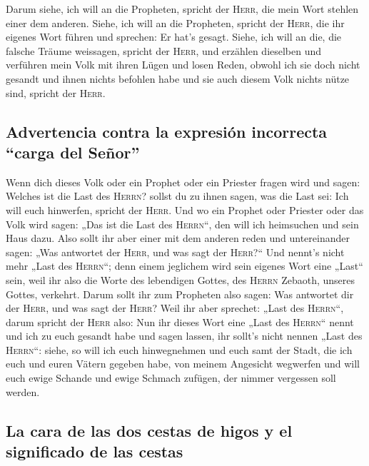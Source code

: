  Darum siehe, ich will an die Propheten, spricht der
\textsc{Herr}, die mein Wort stehlen einer dem anderen. 
Siehe, ich will an die Propheten, spricht der \textsc{Herr}, die ihr
eigenes Wort führen und sprechen: Er hat's gesagt. 
Siehe, ich will an die, die falsche Träume weissagen, spricht der
\textsc{Herr}, und erzählen dieselben und verführen mein Volk mit ihren
Lügen und losen Reden, obwohl ich sie doch nicht gesandt und ihnen
nichts befohlen habe und sie auch diesem Volk nichts nütze sind, spricht
der \textsc{Herr}.

\hypertarget{advertencia-contra-la-expresiuxf3n-incorrecta-carga-del-seuxf1or}{%
\subsection{Advertencia contra la expresión incorrecta ``carga del
Señor''}\label{advertencia-contra-la-expresiuxf3n-incorrecta-carga-del-seuxf1or}}

 Wenn dich dieses Volk oder ein Prophet oder ein Priester
fragen wird und sagen: Welches ist die Last des \textsc{Herrn}? sollst
du zu ihnen sagen, was die Last sei: Ich will euch hinwerfen, spricht
der \textsc{Herr}.  Und wo ein Prophet oder Priester oder
das Volk wird sagen: „Das ist die Last des \textsc{Herrn}``, den will
ich heimsuchen und sein Haus dazu.  Also sollt ihr aber
einer mit dem anderen reden und untereinander sagen: „Was antwortet der
\textsc{Herr}, und was sagt der \textsc{Herr}?{}``  Und
nennt's nicht mehr „Last des \textsc{Herrn}``; denn einem jeglichem wird
sein eigenes Wort eine „Last`` sein, weil ihr also die Worte des
lebendigen Gottes, des \textsc{Herrn} Zebaoth, unseres Gottes, verkehrt.
 Darum sollt ihr zum Propheten also sagen: Was antwortet
dir der \textsc{Herr}, und was sagt der \textsc{Herr}? 
Weil ihr aber sprechet: „Last des \textsc{Herrn}``, darum spricht der
\textsc{Herr} also: Nun ihr dieses Wort eine „Last des \textsc{Herrn}``
nennt und ich zu euch gesandt habe und sagen lassen, ihr sollt's nicht
nennen „Last des \textsc{Herrn}``:  siehe, so will ich
euch hinwegnehmen und euch samt der Stadt, die ich euch und euren Vätern
gegeben habe, von meinem Angesicht wegwerfen  und will
euch ewige Schande und ewige Schmach zufügen, der nimmer vergessen soll
werden.

\hypertarget{la-cara-de-las-dos-cestas-de-higos-y-el-significado-de-las-cestas}{%
\subsection{La cara de las dos cestas de higos y el significado de las
cestas}\label{la-cara-de-las-dos-cestas-de-higos-y-el-significado-de-las-cestas}}

